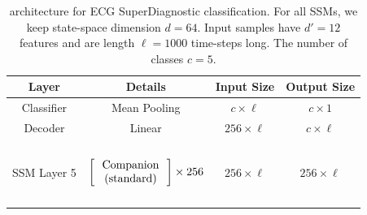 \begin{table}[]
\centering
\caption{\ourmethod{} architecture for ECG SuperDiagnostic classification. For all SSMs, we keep state-space dimension $d = 64$. Input samples have $d' = 12$ features and are length $\ell = 1000$ time-steps long. The number of classes $c = 5$.}
\label{tab:spacetime_ecg_superdiag}
\begin{tabular}{@{}c|c|c|c@{}}
Layer       & Details                                                                                                                                                                                                                                                                                                                 & Input Size        & Output Size       \\ \midrule
Classifier  & Mean Pooling                                                                                                                                                                                                                                                                                                            & $c \times \ell$   & $c \times 1$      \\ \midrule
Decoder     & Linear                                                                                                                                                                                                                                                                                                                  & $256 \times \ell$ & $c \times \ell$   \\ \midrule
SSM Layer 5 & \begin{math}\begin{aligned}    \begin{matrix}    \text{\phantom{-}} \\    \end{matrix}    \\    \begin{bmatrix}    \text{\phantom{-} Companion \phantom{-}}  \\ \text{(standard)} \\    \end{bmatrix}    \times 256     \\    \begin{matrix}    \text{\phantom{-}} \\    \end{matrix}    \\\end{aligned}\end{math}          & $256 \times \ell$ & $256 \times \ell$ \\ \midrule

\end{tabular}
\end{table}
